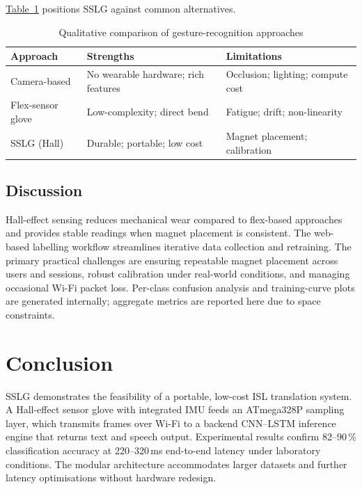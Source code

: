 \documentclass[conference]{IEEEtran}
\newcommand{\TabLink}[1]{\hyperref[#1]{Table~\ref*{#1}}}
\newcommand{\SystemAcronym}{SSLG }
\begin{document}
\TabLink{tab:comparison} positions \SystemAcronym against common alternatives.

\begin{table}[!t]
  \centering\caption{Qualitative comparison of gesture-recognition approaches}
  \label{tab:comparison}
  \begin{tabularx}{\columnwidth}{@{}>{\raggedright\arraybackslash}p{}XX@{}}
    \toprule Approach & Strengths & Limitations \\\midrule
    Camera-based &
      No wearable hardware; rich features &
      Occlusion; lighting; compute cost~\cite{mitra} \\
    Flex-sensor glove &
      Low-complexity; direct bend &
      Fatigue; drift; non-linearity \\
    \SystemAcronym{} (Hall) &
      Durable; portable; low cost &
      Magnet placement; calibration \\
    \bottomrule
  \end{tabularx}
\end{table}

\subsection{Discussion}

Hall-effect sensing reduces mechanical wear compared to flex-based approaches
and provides stable readings when magnet placement is consistent. The
web-based labelling workflow streamlines iterative data collection and
retraining. The primary practical challenges are ensuring repeatable magnet
placement across users and sessions, robust calibration under real-world
conditions, and managing occasional Wi-Fi packet loss. Per-class confusion
analysis and training-curve plots are generated internally; aggregate metrics
are reported here due to space constraints.

\section{Conclusion}

\SystemAcronym demonstrates the feasibility of a portable, low-cost ISL
translation system. A Hall-effect sensor glove with integrated IMU feeds an
ATmega328P sampling layer, which transmits frames over Wi-Fi to a backend
CNN--LSTM inference engine that returns text and speech output. Experimental
results confirm 82--90\,\% classification accuracy at 220--320\,ms
end-to-end latency under laboratory conditions. The modular architecture
accommodates larger datasets and further latency optimisations without
hardware redesign.
\end{document}
